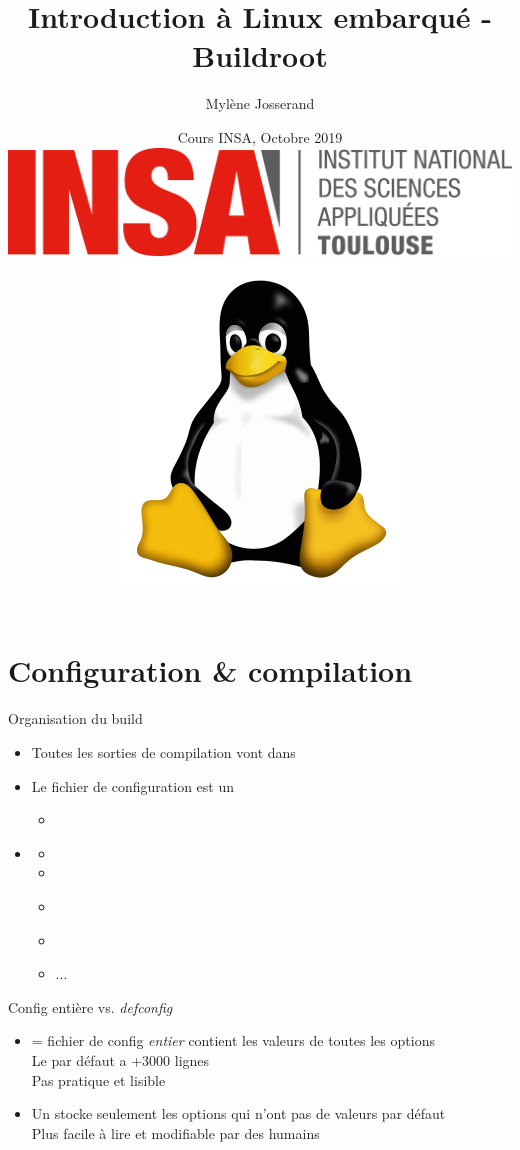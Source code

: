 \documentclass[aspectratio=169,obeyspaces,spaces,hyphens,dvipsnames]{beamer}
\title{Introduction à Linux embarqué - Buildroot}
\author[Mylène Josserand]
{Mylène Josserand}
\date[Octobre 2019]
{Cours INSA, Octobre 2019 \\
  \vspace{0.5cm}
  \includegraphics[scale=0.1]{pictures/insa-tls.png}
  \hspace{0.5cm}
  \includegraphics[scale=0.1]{pictures/tux.png}
}
\institute[]
{Développeuse et formatrice Linux embarqué}
\begin{document}
\begin{frame}
  \titlepage
\end{frame}

\section{Configuration \& compilation}

\begin{frame}{Organisation du build}
  \begin{itemize}
  \item Toutes les sorties de compilation vont dans 
  \item Le fichier de configuration est un 
  \item {}
    \begin{itemize}
    \item {\bf {}}
    \item {}
    \item {}
    \item {\bf {}}
    \item {}
    \item ...
    \end{itemize}
  \end{itemize}
\end{frame}

\begin{frame}{Config entière vs. {\em defconfig}}
  \begin{itemize}
  \item {} = fichier de config {\em entier}
    \MVRightarrow contient les valeurs de toutes les options \\
    Le  par défaut a +3000 lignes \\
    \MVRightarrow Pas pratique et lisible
  \item Un  stocke seulement les options qui n'ont pas de
    valeurs par défaut \\
    \MVRightarrow Plus facile à lire et modifiable par des humains
  \end{itemize}
\end{frame}
\end{document}
